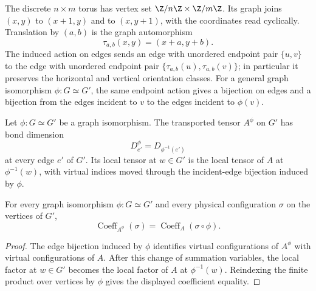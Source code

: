 \begin{definition}%
    \label{def:peps_torus_geometry_translation}
    \leanok
    The discrete $n\times m$ torus has vertex set $\Z/n\Z\times\Z/m\Z$.
    Its graph joins $(x,y)$ to $(x+1,y)$ and to $(x,y+1)$, with the
    coordinates read cyclically. Translation by $(a,b)$ is the graph
    automorphism
    \[
        \tau_{a,b}(x,y)=(x+a,y+b).
    \]
    The induced action on edges sends an edge with unordered endpoint pair
    $\{u,v\}$ to the edge with unordered endpoint pair
    $\{\tau_{a,b}(u),\tau_{a,b}(v)\}$; in particular it preserves the
    horizontal and vertical orientation classes. For a general graph
    isomorphism $\phi:G\simeq G'$, the same endpoint action gives a
    bijection on edges and a bijection from the edges incident to $v$ to
    the edges incident to $\phi(v)$.
\end{definition}

\begin{definition}%
    \label{def:peps_tensor_transport}
    \leanok
    Let $\phi:G\simeq G'$ be a graph isomorphism. The transported tensor
    $A^\phi$ on $G'$ has bond dimension
    \[
        D^\phi_{e'}=D_{\phi^{-1}(e')}
    \]
    at every edge $e'$ of $G'$. Its local tensor at $w\in G'$ is the local
    tensor of $A$ at $\phi^{-1}(w)$, with virtual indices moved through the
    incident-edge bijection induced by $\phi$.
\end{definition}

\begin{theorem}%
    \label{thm:peps_stateCoeff_transport}
    \leanok
    For every graph isomorphism $\phi:G\simeq G'$ and every physical
    configuration $\sigma$ on the vertices of $G'$,
    \[
        \operatorname{Coeff}_{A^\phi}(\sigma)
        =
        \operatorname{Coeff}_{A}(\sigma\circ\phi).
    \]
\end{theorem}
\begin{proof}\leanok
    The edge bijection induced by $\phi$ identifies virtual configurations
    of $A^\phi$ with virtual configurations of $A$. After this change of
    summation variables, the local factor at $w\in G'$ becomes the local
    factor of $A$ at $\phi^{-1}(w)$. Reindexing the finite product over
    vertices by $\phi$ gives the displayed coefficient equality.
\end{proof}

